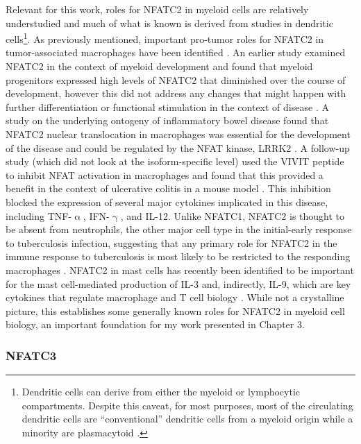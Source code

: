 Relevant for this work, roles for NFATC2 in myeloid cells are relatively understudied and much of what is known is derived from studies in dendritic cells\footnote{Dendritic cells can derive from either the myeloid or lymphocytic compartments. Despite this caveat, for most purposes, most of the circulating dendritic cells are ``conventional'' dendritic cells from a myeloid origin while a minority are plasmacytoid \citep{Shortman2002, Collin2018}.}. As previously mentioned, important pro\hyp{}tumor roles for NFATC2 in tumor\hyp{}associated macrophages have been identified \citep{Liu2018}. An earlier study examined NFATC2 in the context of myeloid development and found that myeloid progenitors expressed high levels of NFATC2 that diminished over the course of development, however this did not address any changes that might happen with further differentiation or functional stimulation in the context of disease \citep{Kiani2004}. A study on the underlying ontogeny of inflammatory bowel disease found that NFATC2 nuclear translocation in macrophages was essential for the development of the disease and could be regulated by the NFAT kinase, LRRK2 \citep{Liu2011}. A follow\hyp{}up study (which did not look at the isoform\hyp{}specific level) used the VIVIT peptide to inhibit NFAT activation in macrophages and found that this provided a benefit in the context of ulcerative colitis in a mouse model \citep{Elloumi2012}. This inhibition blocked the expression of several major cytokines implicated in this disease, including TNF\hyp{}$\upalpha$, IFN\hyp{}$\upgamma$, and IL\hyp{}12. Unlike NFATC1, NFATC2 is thought to be absent from neutrophils, the other major cell type in the initial\hyp{}early response to tuberculosis infection, suggesting that any primary role for NFATC2 in the immune response to tuberculosis is most likely to be restricted to the responding macrophages \citep{Greenblatt2010}. NFATC2 in mast cells has recently been identified to be important for the mast cell\hyp{}mediated production of IL\hyp{}3 and, indirectly, IL\hyp{}9, which are key cytokines that regulate macrophage and T cell biology \citep{Sabbaghi2021}. While not a crystalline picture, this establishes some generally known roles for NFATC2 in myeloid cell biology, an important foundation for my work presented in Chapter 3.

\subsubsection{NFATC3}\label{nfatc3}

